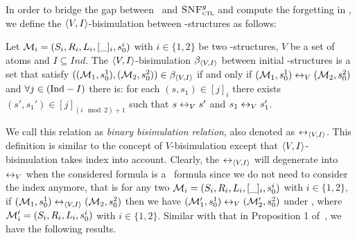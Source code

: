 \documentclass[letterpaper]{article} %
\begin{document}
In order to bridge the gap between \CTL\ and ${\textsc{SNF}_{\textsc{ctl}}^g}$ and compute the forgetting in \CTL, %
we define the ${\langle{V,I}\rangle}$-bisimulation between \Ind-structures as follows:
\begin{definition} \label{def:VInd:bisimulation}
Let ${\cal M}_i=(S_i, R_i, L_i, [\_]_i, s_0^i)$ with $i\in \{1, 2\}$ be two \Ind-structures, $V$ be a set of atoms and $I \subseteq Ind$. The ${\langle{V,I}\rangle}$-bisimulation $\beta_{{\langle{V,I}\rangle}}$ between initial \Ind-structures is a set that satisfy $(({\cal M}_1, s_0^1), ({\cal M}_2, s_0^2)) \in \beta_{{\langle{V,I}\rangle}}$  if and only if $({\cal M}_1, s_0^1) \leftrightarrow_V ({\cal M}_2, s_0^2)$ and $\forall j \in (\textrm{Ind}-I)$ there is: for each $(s, s_1)\in [j]_i$ there exists $(s',s_1')\in [j]_{(i\mod 2)+1}$ such that $s\leftrightarrow_V s'$ and $s_1 \leftrightarrow_V s_1'$.
\end{definition}
We call this relation as \emph{binary bisimulation relation}, also denoted as $\leftrightarrow_{{\langle{V,I}\rangle}}$. This definition is similar to the concept of $V$-bisimulation except that  ${\langle{V,I}\rangle}$-bisimulation takes index into account.
Clearly, the $\leftrightarrow_{{\langle{V,I}\rangle}}$ will degenerate into $\leftrightarrow_V$ when the considered formula is a \CTL\ formula since we do not need to consider the index anymore, that is for any two ${\cal M}_i=(S_i, R_i, L_i, [\_]_i, s_0^i)$ with $i\in \{1, 2\}$, if $({\cal M}_1, s_0^1) \leftrightarrow_{{\langle{V,I}\rangle}} ({\cal M}_2, s_0^2)$ then we have $({\cal M}_1', s_0^1) \leftrightarrow_V ({\cal M}_2', s_0^2)$ under \CTL, where ${\cal M}_i'=(S_i, R_i, L_i, s_0^i)$ with $i\in \{1, 2\}$. Similar with that in Proposition 1 of~\cite{renyansfirstpaper}, we have the following results.

\end{document}
